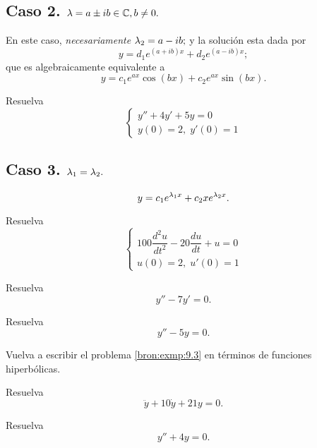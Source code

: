 \subsection{Caso 2. $\lambda =a\pm ib\in \mathbb{C}, b\neq 0.$}
En este caso, 
\emph{necesariamente} $\lambda_{2}=a-ib;$ y 
la soluci\'on esta dada por
\[
	\label{bron:9.5}
	y=d_{1}e^{\left( a+ib \right)x}
	+d_{2}e^{\left( a-ib \right)x};
\]
que es algebraicamente equivalente a
\[
	\label{bron:9.6}
	y=c_{1}e^{ax}\cos(bx)+c_{2}e^{ax}\sin(bx).
\]





\begin{problema}
	\label{bron:exmp:9.7}
	Resuelva
	$$\begin{cases}
		y''+4y'+5y=0 \\
		y(0)=2, \; y'(0)=1
	\end{cases}
	$$
\end{problema}




\subsection{Caso 3. $\lambda_{1}=\lambda_{2}.$}
\[
	\label{bron:9.7}
	y=c_{1}e^{\lambda_{1}x}+c_{2}xe^{\lambda_{2}x}.
\]





\begin{problema}
	\label{bron:exmp:9.15}
	Resuelva
	$$\begin{cases}
		100\dfrac{d^2{u}}{dt^{2}}
		-20\dfrac{du}{dt}+u=0\\
		u(0)=2, \; u'(0)=1
	\end{cases}
	$$
\end{problema}




\begin{problema}
	\label{bron:exmp:9.2}
	Resuelva $$y''-7y'=0.$$
\end{problema}





\begin{problema}
	\label{bron:exmp:9.3}
	Resuelva
	$$y''-5y=0.$$
\end{problema}




\begin{problema}
	\label{bron:exmp:9.4}
	Vuelva a escribir el problema \ref{bron:exmp:9.3} en t\'erminos de funciones hiperb\'olicas.
\end{problema}




\begin{problema}
	\label{bron:exmp:9.5}
	Resuelva
	$$
	\ddot{y}+10\dot{y}+21y=0.
	$$
\end{problema}




\begin{problema}
	\label{bron:exmp:9.8}
	Resuelva
	$$
	y''+4y=0.
	$$
\end{problema}


